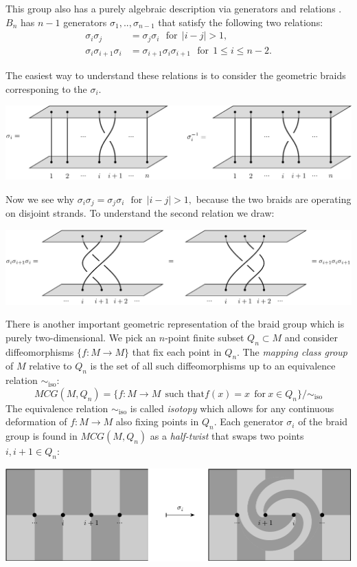 \documentclass[aps, prl, letterpaper, twocolumn, superscriptaddress, notitlepage, 10pt]{revtex4-1}
\begin{document}
This group also has a purely algebraic description via
generators and relations \cite{Artin1947,Birman1974}.
$B_n$ has $n-1$ generators $\sigma_1,..,\sigma_{n-1}$ that satisfy
the following two relations:
\begin{align*}
    \sigma_i \sigma_j &= \sigma_j \sigma_i \ \ \ \mbox{for}\ \ |i-j|>1,\\
    \sigma_i \sigma_{i+1} \sigma_i &= \sigma_{i+1} \sigma_i \sigma_{i+1} \ \ \ \mbox{for}\ \ 1\le i \le n-2.
\end{align*}

The easiest way to understand these relations is to consider the
geometric braids corresponing to the $\sigma_i.$
\begin{center}
\includegraphics[]{pic-braid-sigma.pdf}
\end{center}
Now we see why 
$\sigma_i \sigma_j = \sigma_j \sigma_i \ \ \ \mbox{for}\ \ |i-j|>1,$
because the two braids are operating on disjoint strands.
To understand the second relation we draw:
\begin{center}
\includegraphics[]{pic-braid-YB.pdf}
\end{center}

There is another important geometric representation of
the braid group which is purely two-dimensional.
We pick an $n$-point finite subset $Q_n \subset M$
and consider diffeomorphisms $\{ f : M \to M \}$
that fix each point in $Q_n$.
The \emph{mapping class group} of $M$ relative to $Q_n$
is the set of all such diffeomorphisms up to an equivalence relation $\sim_{\mbox{iso}}$:
$$
    MCG(M, Q_n) = \{ f : M \to M \ \ \mbox{such that} f(x)=x \ \ \mbox{for}\ x\in Q_n\} / \sim_{\mbox{iso}}
$$
The equivalence relation $\sim_{\mbox{iso}}$ is called \emph{isotopy}
which allows for any continuous deformation of $f:M\to M$ also
fixing points in $Q_n.$
Each generator $\sigma_i$ of the braid group is found in $MCG(M, Q_n)$
as a \emph{half-twist} that swaps two points $i, i+1 \in Q_n$:
\begin{center}
\includegraphics[]{pic-halftwist.pdf}
\end{center}
\end{document}
